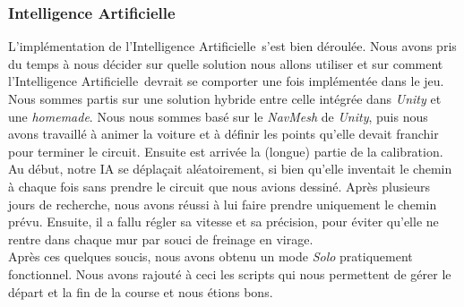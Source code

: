 \documentclass[a4paper,12pt]{article}
\newcommand{\AI}{Intelligence Artificielle}
\begin{document}
            \subsubsection{\AI}
                L'implémentation de l'\AI\, s'est bien déroulée. Nous avons pris du temps
                à nous décider sur quelle solution nous allons utiliser et sur comment
                l'\AI\, devrait se comporter une fois implémentée dans le jeu. Nous sommes partis sur une
                solution hybride entre celle intégrée dans \textsl{Unity} et une \textit{homemade}.
                Nous nous sommes basé sur le \textit{NavMesh} de \textsl{Unity}, puis nous avons
                travaillé à animer la voiture et à définir les points qu'elle devait franchir pour
                terminer le circuit. Ensuite est arrivée
                la (longue) partie de la calibration. Au début, notre IA se déplaçait aléatoirement,
                si bien qu'elle inventait le chemin à chaque fois sans prendre le circuit que nous
                avions dessiné. Après plusieurs jours de recherche, nous avons réussi à lui faire
                prendre uniquement le chemin prévu. Ensuite, il a fallu régler sa vitesse et sa
                précision, pour éviter qu'elle ne rentre dans chaque mur par souci de freinage en virage.\\
                Après ces quelques soucis, nous avons obtenu un mode \textsl{Solo} pratiquement
                fonctionnel. Nous avons rajouté à ceci les scripts qui nous permettent de gérer
                le départ et la fin de la course et nous étions bons.
\end{document}
